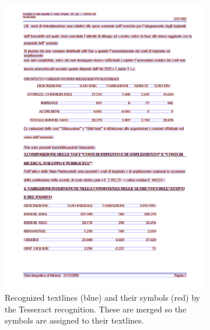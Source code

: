 \begin{figure}[p]
\begin{subfigure}{0.45\textwidth}
\includegraphics[width=\linewidth]{img/implementation/implem1.png}
\caption{Recognized textlines (blue) and their symbols (red) by the Tesseract recognition. These are merged so the symbols are assigned to their textlines.}
\label{fig:implem1}
\end{subfigure}
\qquad
\begin{subfigure}{0.45\textwidth}

\end{subfigure}
\end{figure}
